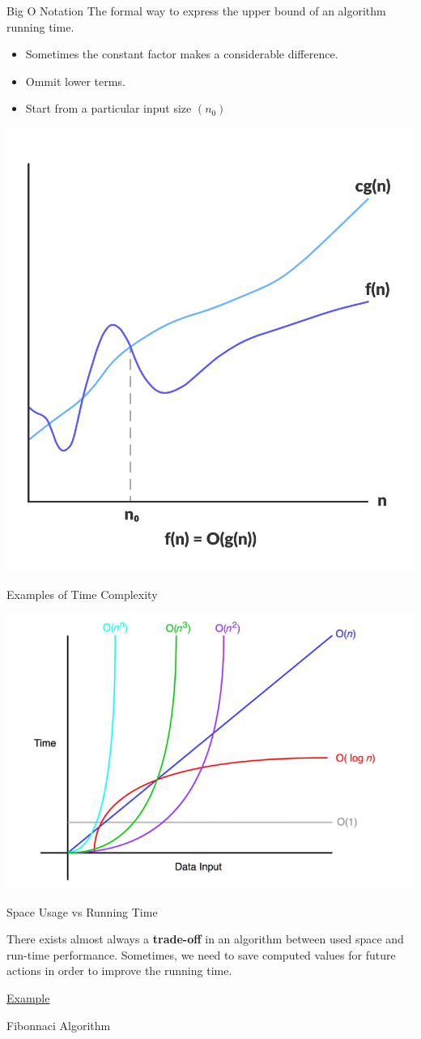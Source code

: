 \documentclass{beamer}
\begin{document}
\begin{frame}{Big O Notation}
  The formal way to express the upper bound of an algorithm running time.
  
  \begin{itemize}
    \item Sometimes the constant factor makes a considerable difference.
    \item Ommit lower terms.
    \item Start from a particular input size $(n_0)$
  \end{itemize}

  \begin{center}
    \includegraphics[width=.35\linewidth]{../img/bigO}
  \end{center}
\end{frame}

\begin{frame}{Examples of Time Complexity}
  \begin{center}
    \includegraphics[width=.85\linewidth]{../img/bigOchart}
  \end{center}
\end{frame}

\begin{frame}{Space Usage vs Running Time}

  There exists almost always a \textbf{trade-off} in an algorithm between used space and run-time performance. Sometimes, we need to save computed values for future actions in order to improve the running time.

  \underline{Example}

  Fibonnaci Algorithm

\end{frame}
\end{document}
